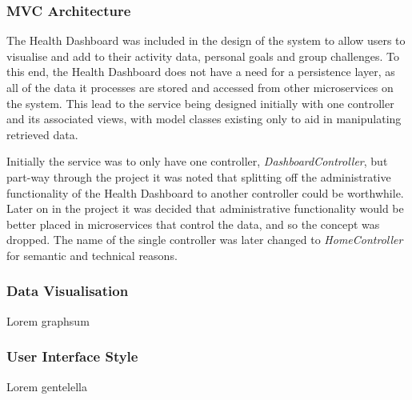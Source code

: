 \subsubsection{MVC Architecture}
\par
The Health Dashboard was included in the design of the system to allow users to visualise and add to their activity data, personal goals and group challenges. To this end, the Health Dashboard does not have a need for a persistence layer, as all of the data it processes are stored and accessed from other microservices on the system. This lead to the service being designed initially with one controller and its associated views, with model classes existing only to aid in manipulating retrieved data.

\par
Initially the service was to only have one controller, \textit{DashboardController}, but part-way through the project it was noted that splitting off the administrative functionality of the Health Dashboard to another controller could be worthwhile. Later on in the project it was decided that administrative functionality would be better placed in microservices that control the data, and so the concept was dropped. The name of the single controller was later changed to \textit{HomeController} for semantic and technical reasons.

\subsubsection{Data Visualisation}
\par
Lorem graphsum

\subsubsection{User Interface Style}
\par
Lorem gentelella
